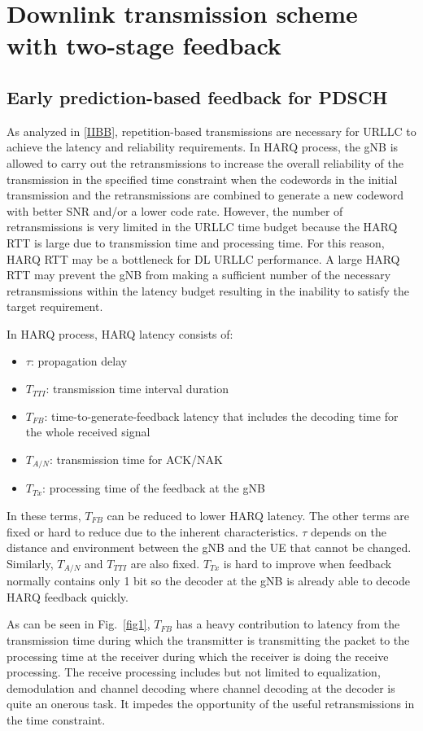 \documentclass[conference]{IEEEtran}
\begin{document}
\section{Downlink transmission scheme with two-stage feedback}
\subsection{Early prediction-based feedback for PDSCH}\label{AA}
As analyzed in \ref{IIBB}, repetition-based transmissions are necessary for URLLC to achieve the latency and reliability requirements. In HARQ process, the gNB is allowed to carry out the retransmissions to increase the overall reliability of the transmission in the specified time constraint when the codewords in the initial transmission and the retransmissions are combined to generate a new codeword with better SNR and/or a lower code rate.  However, the number of retransmissions is very limited in the URLLC time budget because the HARQ RTT is large due to transmission time and processing time. For this reason, HARQ RTT may be a bottleneck for DL URLLC performance. A large HARQ RTT may prevent the gNB from making a sufficient number of the necessary retransmissions within the latency budget resulting in the inability to satisfy the target requirement. 

In HARQ process, HARQ latency consists of:

\begin{itemize}
    \item $\tau$: propagation delay
    \item $T_{TTI}$: transmission time interval duration
    \item $T_{FB}$: time-to-generate-feedback latency that includes the decoding time for the whole received signal
    \item $T_{A/N}$: transmission time for ACK/NAK
    \item $T_{Tx}$: processing time of the feedback at the gNB
\end{itemize}

In these terms, $T_{FB}$ can be reduced to lower HARQ latency. The other terms are fixed or hard to reduce due to the inherent characteristics. $\tau$ depends on the distance and environment between the gNB and the UE that cannot be changed. Similarly, $T_{A/N}$ and $T_{TTI}$ are also fixed. $T_{Tx}$ is hard to improve when feedback normally contains only 1 bit so the decoder at the gNB is already able to decode HARQ feedback quickly. 

As can be seen in Fig.~\ref{fig1}, $T_{FB}$ has a heavy contribution to latency from the transmission time during which the transmitter is transmitting the packet to the processing time at the receiver during which the receiver is doing the receive processing. The receive processing includes but not limited to equalization, demodulation and channel decoding where channel decoding at the decoder is quite an onerous task. It impedes the opportunity of the useful retransmissions in the time constraint.
\end{document}
